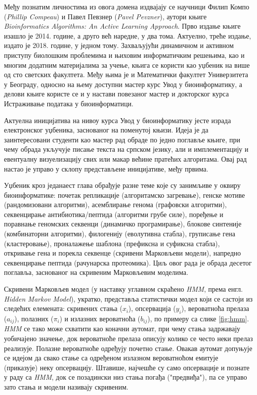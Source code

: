 \documentclass[12pt,oneside]{memoir}
\begin{document}
Међу познатим личностима из овога домена издвајају се научници Филип Компо (\textit{Phillip Compeau}) и Павел Певзнер (\textit{Pavel Pevzner}), аутори књиге \textit{Bioinformatics Algorithms: An Active Learning Approach}. Прво издање књиге изашло је 2014. године, а друго већ наредне, у два тома. Актуелно, треће издање, издато је 2018. године, у једном тому. Захваљујући динамичном и активном приступу биолошким проблемима и њиховим информатичким решењима, као и многим додатним материјалима за учење, књига се користи као уџбеник на више од сто светских факултета\cite{ba}. Међу њима је и Математички факултет Универзитета у Београду, односно на њему доступни мастер курс Увод у биоинформатику, а делови књиге користе се и у настави повезаног мастер и докторског курса Истраживање података у биоинформатици\cite{matf}.

Актуелна иницијатива на нивоу курса Увод у биоинформатику јесте израда електронског уџбеника, заснованог на поменутој књизи. Идеја је да заинтересовани студенти као мастер рад обраде по једно поглавље књиге, при чему обрада укључује писање текста на српском језику, али и имплементацију и евентуалну визуелизацију свих или макар већине пратећих алгоритама. Овај рад настао је управо у склопу представљене иницијативе, међу првима.

Уџбеник кроз једанаест глава обрађује разне теме које су занимљиве у оквиру биоинформатике: почетак репликације (алгоритамско загревање), генске мотиве (рандомизовани алгоритми), асемблирање генома (графовски алгоритми), секвенцирање антибиотика/пептида (алгоритми грубе силе), поређење и поравнање геномских секвенци (динамичко програмирање), блокове синтеније (комбинаторни алгоритми), филогенију (еволутивна стабла), груписање гена (кластеровање), проналажење шаблона (префиксна и суфиксна стабла), откривање гена и порекла секвенце (скривени Марковљеви модели), напредно секвенцирање пептида (рачунарска протеомика). Циљ овог рада је обрада десетог поглавља, заснованог на скривеним Марковљевим моделима\cite{compeau2015}.

Скривени Марковљев модел (у наставку углавном скраћено \textit{HMM}, према енгл. \textit{Hidden Markov Model}), укратко, представља статистички модел који се састоји из следећих елемената: скривених стања ($x_i$), опсервација ($y_i$), вероватноћа прелаза ($a_{ij}$), полазних ($\pi_i$) и излазних вероватноћа ($b_{ij}$), по примеру са слике \ref{fig:hmm}. \textit{HMM} се тако може схватити као коначни аутомат, при чему стања задржавају уобичајено значење, док вероватноће прелаза описују колико се често неки прелаз реализује. Полазне вероватноће одређују почетно стање. Овакав аутомат допуњује се идејом да свако стање са одређеном излазном вероватноћом емитује (приказује) неку опсервацију. Штавише, најчешће су само опсервације и познате у раду са \textit{HMM}, док се позадински низ стања погађа ("предвиђа"), па се управо зато стања и модели називају скривеним\cite{stamp2021}.
\end{document}
